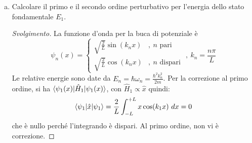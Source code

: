 \documentclass[11pt, a4paper]{scrartcl} %
\numberwithin{equation}{subsection}
\theoremstyle{style2}
\theoremstyle{style1}
\renewcommand\qedsymbol{$\blacksquare$}
\newenvironment{svolgimento}{\renewcommand\qedsymbol{$\spadesuit$}\begin{proof}[Svolgimento]}{\end{proof}}
\begin{document}
\begin{enumerate}[(a).]
	\item Calcolare il primo e il secondo ordine perturbativo per l'energia dello stato fondamentale $E_1$.
		\begin{svolgimento}
			La funzione d'onda per la buca di potenziale \`e
			\[
			\psi _n(x) = \begin{cases}
				\sqrt{\frac{2}{L}} \sin (k_n x) &,\ n \text{ pari }\\
				\sqrt{\frac{2}{L}} \cos (k_n x) &,\ n \text{ dispari }
			\end{cases}, \ k_n = \frac{n \pi }{L}
			\] 
			Le relative energie sono date da $E_n = \hbar \omega _n = \frac{\hbar ^2 k_n^2}{2m}$.
			Per la correzione al primo ordine, si ha $\braket{\psi _1(x)|\hat{H}_1|\psi _1(x)}$, con $\hat{H}_1 \propto \hat{x}$ quindi:
			\[
				\begin{split}
					\braket{\psi_1|\hat{x}|\psi _1} = \frac{2}{L}\int_{-L} ^{+L} x \cos(k_1 x)\ dx = 0
				\end{split}
			\] 
			che \`e nullo perch\'e l'integrando \`e dispari.
			Al primo ordine, non vi \`e correzione.


\end{svolgimento}
\end{enumerate}
\end{document}
